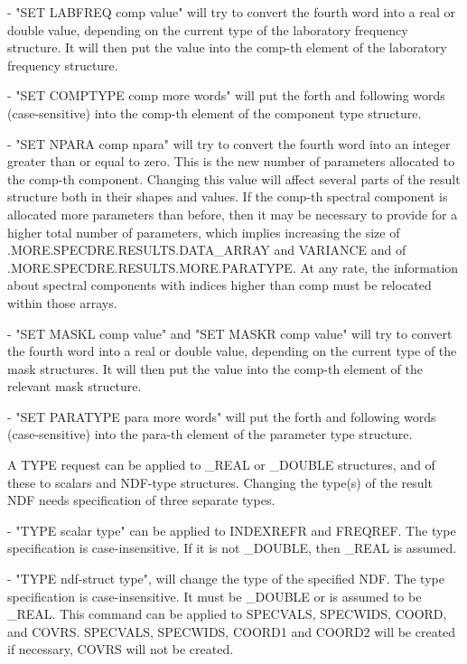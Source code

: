 \begin{description}
   -  "SET LABFREQ comp value" will try to convert the fourth
      word into a real or double value, depending on the current
      type of the laboratory frequency structure. It will then put
      the value into the comp-th element of the laboratory
      frequency structure.

   -  "SET COMPTYPE comp more words" will put the forth and
      following words (case-sensitive) into the comp-th element
      of the component type structure.

   -  "SET NPARA comp npara" will try to convert the fourth word
      into an integer greater than or equal to zero. This is the
      new number of parameters allocated to the comp-th component.
      Changing this value will affect several parts of the result
      structure both in their shapes and values. If the comp-th
      spectral component is allocated more parameters than before,
      then it may be necessary to provide for a higher total
      number of parameters, which implies increasing the size of
      .MORE.SPECDRE.RESULTS.DATA_ARRAY and VARIANCE and of
      .MORE.SPECDRE.RESULTS.MORE.PARATYPE. At any rate, the
      information about spectral components with indices higher
      than comp must be relocated within those arrays.

   -  "SET MASKL comp value" and "SET MASKR comp value" will try
      to convert the fourth word into a real or double value,
      depending on the current type of the mask structures. It
      will then put the value into the comp-th element of the
      relevant mask structure.

   -  "SET PARATYPE para more words" will put the forth and
      following words (case-sensitive) into the para-th element
      of the parameter type structure.

   A TYPE request can be applied to _REAL or _DOUBLE structures,
   and of these to scalars and NDF-type structures. Changing the
   type(s) of the result NDF needs specification of three separate
   types.

   -  "TYPE scalar type" can be applied to INDEXREFR and FREQREF.
      The type specification is case-insensitive. If it is not
      _DOUBLE, then _REAL is assumed.

   -  "TYPE ndf-struct type", will change the type of the
      specified NDF. The type specification is case-insensitive. It
      must be _DOUBLE or is assumed to be _REAL. This command can
      be applied to SPECVALS, SPECWIDS, COORD, and COVRS. SPECVALS,
      SPECWIDS, COORD1 and COORD2 will be created if necessary,
      COVRS will not be created.


\end{description}
